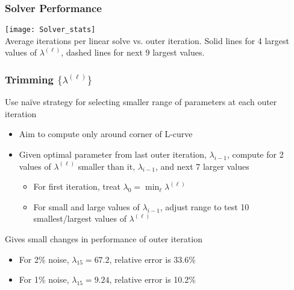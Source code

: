 \documentclass[12pt,t,xcolor=dvipsnames]{beamer}
\begin{document}
\begin{frame}
\frametitle{Solver Performance}

\begin{center}
  \texttt{[image: Solver\_stats]}\\
  Average iterations per linear solve vs. outer iteration.  Solid
  lines for 4 largest values of $\lambda^{(\ell)}$, dashed lines for
  next 9 largest values.
\end{center}

\end{frame}

\begin{frame}
  \frametitle{Trimming $\{\lambda^{(\ell)}\}$}

  Use na\"ive strategy for selecting smaller range of parameters at
  each outer iteration
  \begin{itemize}
  \item Aim to compute only around corner of L-curve
    \item Given optimal parameter from last outer iteration,
      $\lambda_{i-1}$, compute for 2 values of $\lambda^{(\ell)}$
      smaller than it, $\lambda_{i-1}$, and next 7 larger values
      \begin{itemize}
\item For first iteration, treat $\lambda_0 = \min_\ell
  \lambda^{(\ell)}$
  \item For small and large values of $\lambda_{i-1}$, adjust range to
    test 10 smallest/largest values of $\lambda^{(\ell)}$
      \end{itemize}
      
  \end{itemize}

  Gives small changes in performance of outer iteration
  \begin{itemize}
  \item For 2\% noise, $\lambda_{15} = 67.2$, relative error is 33.6\%
    \item For 1\% noise, $\lambda_{15} = 9.24$, relative error is 10.2\%
  \end{itemize}
  
  \end{frame}
\end{document}
